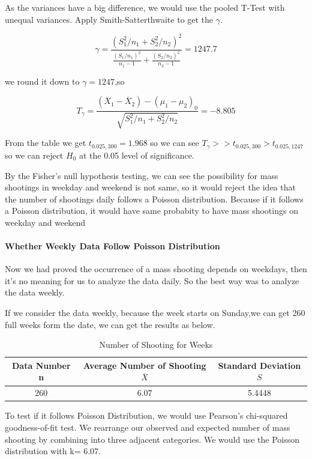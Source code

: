 \documentclass[12pt]{article}
\begin{document}
As the variances have a big difference, we would use the pooled T-Test with unequal variances. Apply  Smith-Satterthwaite to get the $\gamma$.

$$\gamma=\frac{(S_1^2/n_1+S_2^2/n_2)^2}{\frac{(S_1/n_1)^2}{n_1-1}+\frac{(S_2/n_2)^2}{n_2-1}}=1247.7$$

we round it down to $\gamma=1247$,so

$$T_\gamma=\frac{(\overline X_1-\overline X_2)-(\mu_1-\mu_2)_0}{\sqrt{S_1^2/n_1+S_2^2/n_2}}=-8.805$$

From the table we get $t_{0.025,300}=1.968$ so we can see $T_\gamma >>t_{0.025,300}>t_{0.025,1247}$ so we can reject $H_0$ at the 0.05 level of significance.

By the Fisher’s null hypothesis testing, we can see the possibility for mass shootings in weekday and weekend is not same, so it would reject the idea that the number of shootings daily follows a Poisson distribution. Because if it follows a Poisson distribution, it would have same probabity to have mass shootings on weekday and weekend



\paragraph{Whether  Weekly Data Follow Poisson Distribution}

Now we had proved the occurrence of a mass shooting depends on weekdays, then it's no meaning for us to analyze the data daily. So the best way was to analyze the data weekly.
\par If we consider the data weekly, because the week starts on Sunday,we can get 260 full weeks form the date, we can get the results as below.

\begin{table} [!htbp]
\begin{center}
\begin{tabular*} {14cm} {@{\extracolsep{\fill} }ccc}
\toprule
Data Number n &Average Number of Shooting $\overline X$ & Standard Deviation $S$\\
\midrule
260 & 6.07	& 5.4448\\
\bottomrule
\end{tabular*}
\end{center}
\caption{Number of Shooting for Weeks}
\end{table}

To test if it follows Poisson Distribution, we would use Pearson’s chi-squared goodness-of-fit test. We rearrange our observed and expected number of mass shooting by combining into three adjacent categories.  We would use the Poisson distribution with k= 6.07.
\end{document}
